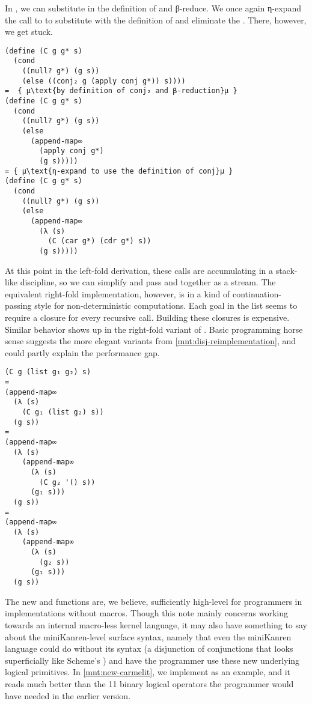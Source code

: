 \documentclass[sigplan,balance=true,pbalance=true,natbib=false]{acmart}
\begin{document}
In , we can substitute in the definition of
 and β-reduce. We once again η-expand the call to
 to substitute with the definition of
 and eliminate the . There,
however, we get stuck.

\begin{verbatim}
(define (C g g* s)
  (cond
    ((null? g*) (g s))
    (else ((conj₂ g (apply conj g*)) s))))
=  { μ\text{by definition of conj₂ and β-reduction}μ }
(define (C g g* s)
  (cond
    ((null? g*) (g s))
    (else
      (append-map∞
        (apply conj g*)
        (g s)))))
= { μ\text{η-expand to use the definition of conj}μ }
(define (C g g* s)
  (cond
    ((null? g*) (g s))
    (else
      (append-map∞
        (λ (s)
          (C (car g*) (cdr g*) s))
        (g s)))))
\end{verbatim}

At this point in the left-fold derivation, these calls are
accumulating in a stack-like discipline, so we can simplify and pass
 and  together as a stream. The equivalent
right-fold implementation, however, is in a kind of
continuation-passing style for non-deterministic computations. Each
goal in the list seems to require a closure for every recursive call.
Building these closures is expensive. Similar behavior shows up in the
right-fold variant of . Basic programming horse sense
suggests the more elegant variants from
\cref{mnt:disj-reimplementation}, and could partly explain the
performance gap.

\begin{verbatim}
(C g (list g₁ g₂) s)
=
(append-map∞
  (λ (s)
    (C g₁ (list g₂) s))
  (g s))
=
(append-map∞
  (λ (s)
    (append-map∞
      (λ (s)
        (C g₂ '() s))
      (g₁ s)))
  (g s))
=
(append-map∞
  (λ (s)
    (append-map∞
      (λ (s)
        (g₂ s))
      (g₁ s)))
  (g s))
\end{verbatim}

The new  and  functions are, we
believe, sufficiently high-level for programmers in implementations
without macros. Though this note mainly concerns working towards an
internal macro-less kernel language, it may also have something to say
about the miniKanren-level surface syntax, namely that even the
miniKanren language could do without its  syntax (a
disjunction of conjunctions that looks superficially like
Scheme's ) and have the programmer use these new
underlying logical primitives. In \cref{mnt:new-carmelit}, we
implement  as an example, and it reads
much better than the 11 binary logical operators the programmer would
have needed in the earlier version.
\end{document}
